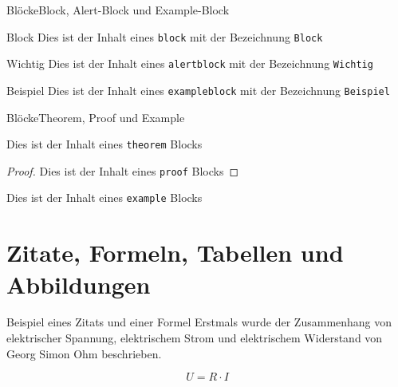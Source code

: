 \begin{frame}{Blöcke}{Block, Alert-Block und Example-Block}
    \begin{block}{Block}
    Dies ist der Inhalt eines \verb"block" mit der Bezeichnung \verb"Block"
    \end{block}

    \begin{alertblock}{Wichtig}
    Dies ist der Inhalt eines \verb"alertblock" mit der Bezeichnung \verb"Wichtig"
    \end{alertblock}

    \begin{exampleblock}{Beispiel}
    Dies ist der Inhalt eines \verb"exampleblock" mit der Bezeichnung \verb"Beispiel"
    \end{exampleblock}
\end{frame}

\begin{frame}{Blöcke}{Theorem, Proof und Example}
    \begin{theorem}
    Dies ist der Inhalt eines \verb"theorem" Blocks
    \end{theorem}

    \begin{proof}
    Dies ist der Inhalt eines \verb"proof" Blocks
    \end{proof}

    \begin{example}
    Dies ist der Inhalt eines \verb"example" Blocks
    \end{example}
\end{frame}


\section{Zitate, Formeln, Tabellen und Abbildungen} %

\begin{frame}{Beispiel eines Zitats und einer Formel}
    Erstmals wurde der Zusammenhang von elektrischer Spannung, elektrischem Strom und elektrischem Widerstand von Georg Simon Ohm beschrieben. \cite{Ohm.1827}

    \begin{equation}
        U = R \cdot I
    \end{equation}
\end{frame}


